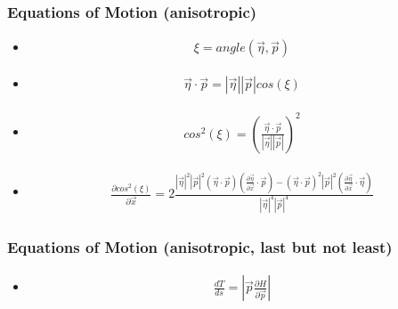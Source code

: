 \documentclass{beamer}
\begin{document}
\begin{frame}
\frametitle{Equations of Motion (anisotropic)}

\begin{itemize}

\pause \item
\begin{eqnarray}
\xi = angle(\vec{\eta},\vec{p}) \nonumber 
\end{eqnarray}
\pause \item
\begin{eqnarray}
\vec{\eta} \cdot \vec{p} = |\vec{\eta}| |\vec{p}| cos ( \xi ) \nonumber 
\end{eqnarray}
\pause \item
\begin{eqnarray}
cos^2(\xi) = \left(\frac{\vec{\eta} \cdot \vec{p}}{|\vec{\eta}||\vec{p}|}\right)^2 \nonumber 
\end{eqnarray}
\pause \item
\begin{eqnarray}
\frac {\partial cos^2(\xi)}{\partial \vec{x}} = 2 \frac {|\vec{\eta}|^2|\vec{p}|^2 (\vec{\eta} \cdot \vec{p}) (\frac{\partial \vec{\eta}}{\partial \vec{x}} \cdot \vec{p}) - (\vec{\eta} \cdot \vec{p})^2 |\vec{p}|^2 (\frac{\partial \vec{\eta}}{\partial \vec{x}} \cdot \vec{\eta})}{|\vec{\eta}|^4 |\vec{p}|^4} \nonumber
\end{eqnarray}

\end{itemize}

\end{frame}

\begin{frame}
\frametitle{Equations of Motion (anisotropic, last but not least)}

\begin{itemize}

\pause \item 
\begin{eqnarray}
\frac{dT}{ds} = |\vec{p} \frac{\partial H}{\partial \vec{p}}| \nonumber
\end{eqnarray}



\end{itemize}

\end{frame}
\end{document}
